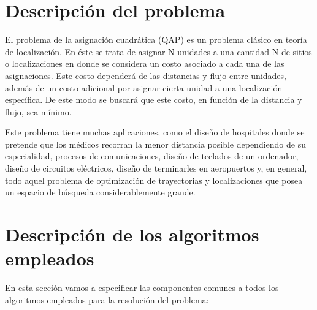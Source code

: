 \newpage %

\tableofcontents %

\listoffigures


\newpage




\section{Descripción del problema}
El problema de la asignación cuadrática (QAP) es un problema clásico en teoría de localización. En éste se trata de asignar N unidades a una cantidad N de sitios o localizaciones en donde se considera un costo asociado a cada una de las asignaciones. Este costo dependerá de las distancias y flujo entre unidades, además de un costo adicional por asignar cierta unidad a una localización específica. De este modo se buscará que este costo, en función de la distancia y flujo, sea mínimo.

Este problema tiene muchas aplicaciones, como el diseño de hospitales donde se pretende que los médicos recorran la menor distancia posible dependiendo de su especialidad, procesos de comunicaciones, diseño de teclados de un ordenador, diseño de circuitos eléctricos, diseño de terminarles en aeropuertos y, en general, todo aquel problema de optimización de trayectorias y localizaciones que posea un espacio de búsqueda considerablemente grande.

\section{Descripción de los algoritmos empleados}

En esta sección vamos a especificar las componentes comunes a todos los algoritmos empleados para la resolución del problema:


